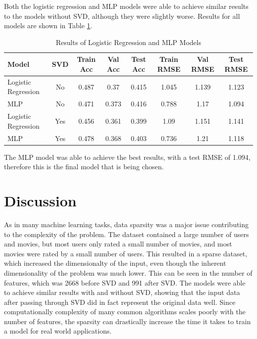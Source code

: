 \documentclass[12pt]{article}
\begin{document}
Both the logistic regression and MLP models
were able to achieve similar results to the models without SVD, although 
they were slightly worse. Results for all models are shown in Table \ref{tab:results}.



\begin{table}[H]
    \centering
    \caption{Results of Logistic Regression and MLP Models}
    \label{tab:results}
    \setlength{\tabcolsep}{3pt}
    \begin{tabular}{lccccccc}  %
        \toprule
        Model & SVD & Train Acc & Val Acc & Test Acc & Train RMSE & Val RMSE & Test RMSE \\
        \midrule
        Logistic Regression & No & 0.487 & 0.37 & 0.415 & 1.045 & 1.139 & 1.123 \\
        MLP & No & 0.471 & 0.373 & 0.416 & 0.788 & 1.17 & 1.094 \\
        Logistic Regression & Yes & 0.456 & 0.361 & 0.399 & 1.09 & 1.151 & 1.141 \\
        MLP & Yes & 0.478 & 0.368 & 0.403 & 0.736 & 1.21 & 1.118 \\
        \bottomrule
    \end{tabular}
\end{table}
The MLP model was able to achieve the best results, with a test 
RMSE of 1.094, therefore this is the final model that is being chosen. 


\section{Discussion}
As in many machine learning tasks, data sparsity was a 
major issue contributing to the complexity of the problem.
The dataset contained a large number of users and movies, but
most users only rated a small number of movies, and most movies 
were rated by a small number of users. This resulted in a 
sparse dataset, which increased the dimensionalty of the input,
even though the inherent dimensionality of the problem was much lower. This 
can be seen in the number of features, which was 2668 before SVD
and 991 after SVD. The models were able to achieve similar results
 with and without SVD, showing that the input data after 
 passing through SVD did in fact represent the original data well. Since
 computationally complexity of many common algorithms scales poorly 
 with the number of features, the sparsity can drastically increase the 
time it takes to train a model for real world applications.
\end{document}
